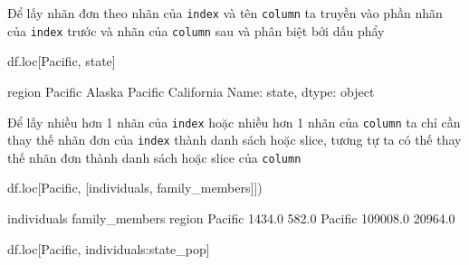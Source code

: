 \documentclass[
]{book}
\newenvironment{Shaded}{\begin{snugshade}}{\end{snugshade}}
\newcommand{\NormalTok}[1]{#1}
\newcommand{\StringTok}[1]{\textcolor[rgb]{0.31,0.60,0.02}{#1}}
\begin{document}
Để lấy nhãn đơn theo nhãn của \texttt{index} và tên \texttt{column} ta truyền vào phần nhãn của \texttt{index} trước và nhãn của \texttt{column} sau và phân biệt bởi dấu phẩy

\begin{Shaded}
\begin{Highlighting}[]
\NormalTok{df.loc[}\StringTok{\textquotesingle{}Pacific\textquotesingle{}}\NormalTok{, }\StringTok{\textquotesingle{}state\textquotesingle{}}\NormalTok{]}
\end{Highlighting}
\end{Shaded}

\begin{Shaded}
\begin{Highlighting}[]
\NormalTok{region}
\NormalTok{Pacific        Alaska}
\NormalTok{Pacific    California}
\NormalTok{Name: state, dtype: object}
\end{Highlighting}
\end{Shaded}

Để lấy nhiều hơn 1 nhãn của \texttt{index} hoặc nhiều hơn 1 nhãn của \texttt{column} ta chỉ cần thay thế nhãn đơn của \texttt{index} thành danh sách hoặc slice, tương tự ta có thế thay thế nhãn đơn thành danh sách hoặc slice của \texttt{column}

\begin{Shaded}
\begin{Highlighting}[]
\NormalTok{df.loc[}\StringTok{\textquotesingle{}Pacific\textquotesingle{}}\NormalTok{, [}\StringTok{\textquotesingle{}individuals\textquotesingle{}}\NormalTok{, }\StringTok{\textquotesingle{}family\_members\textquotesingle{}}\NormalTok{]])}
\end{Highlighting}
\end{Shaded}

\begin{Shaded}
\begin{Highlighting}[]
\NormalTok{         individuals  family\_members}
\NormalTok{region                              }
\NormalTok{Pacific       1434.0           582.0}
\NormalTok{Pacific     109008.0         20964.0}
\end{Highlighting}
\end{Shaded}

\begin{Shaded}
\begin{Highlighting}[]
\NormalTok{df.loc[}\StringTok{\textquotesingle{}Pacific\textquotesingle{}}\NormalTok{, }\StringTok{\textquotesingle{}individuals\textquotesingle{}}\NormalTok{:}\StringTok{\textquotesingle{}state\_pop\textquotesingle{}}\NormalTok{]}
\end{Highlighting}
\end{Shaded}
\end{document}
